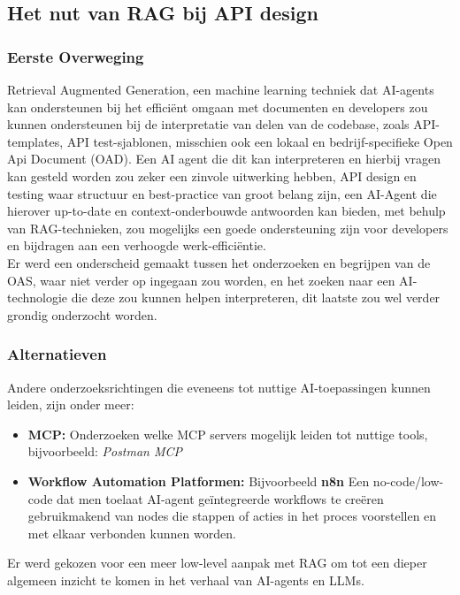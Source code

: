\subsection{Het nut van RAG bij API design}
\label{ssec:hetnutvanragbijapidesign}
\subsubsection{Eerste Overweging}
\label{sssec:eersteoverweging}
Retrieval Augmented Generation, een machine learning techniek dat AI-agents kan ondersteunen bij het efficiënt omgaan met documenten en developers zou kunnen ondersteunen bij de interpretatie van delen van de codebase, zoals API-templates, API test-sjablonen, misschien ook een lokaal en bedrijf-specifieke Open Api Document (OAD). Een AI agent die dit kan interpreteren en hierbij vragen kan gesteld worden zou zeker een zinvole uitwerking hebben, API design en testing waar structuur en best-practice van groot belang zijn, een AI-Agent die hierover up-to-date en context-onderbouwde antwoorden kan bieden, met behulp van RAG-technieken, zou mogelijks een goede ondersteuning zijn voor developers en bijdragen aan een verhoogde werk-efficiëntie. \\

Er werd een onderscheid gemaakt tussen het onderzoeken en begrijpen van de OAS, waar niet verder op ingegaan zou worden, en het zoeken naar een AI-technologie die deze zou kunnen helpen interpreteren, dit laatste zou wel verder grondig onderzocht worden.

\subsubsection{Alternatieven}
\label{sssec:alternatieven}
Andere onderzoeksrichtingen die eveneens tot nuttige AI-toepassingen kunnen leiden, zijn onder meer:

\begin{itemize}
    \item \textbf{MCP:} Onderzoeken welke MCP servers mogelijk leiden tot nuttige tools, bijvoorbeeld: \textit{Postman MCP}
    \item \textbf{Workflow Automation Platformen:} Bijvoorbeeld \textbf{n8n} Een no-code/low-code dat men toelaat AI-agent geïntegreerde workflows te creëren gebruikmakend van nodes die stappen of acties in het proces voorstellen en met elkaar verbonden kunnen worden.
\end{itemize}

Er werd gekozen voor een meer low-level aanpak met RAG om tot een dieper algemeen inzicht te komen in het verhaal van AI-agents en LLMs.

